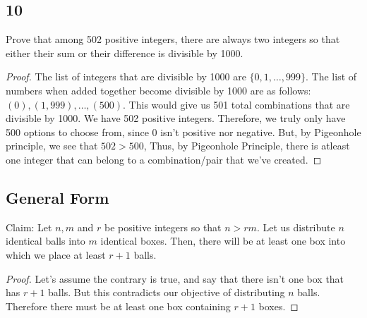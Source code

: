 \documentclass{amsart}
\begin{document}
\subsection*{10} Prove that among 502 positive integers, there are always two integers so that either their sum or their difference is divisible by 1000. 
\begin{proof}
    The list of integers that are divisible by 1000 are $\{0,1,\ldots,999\}$. The list of numbers when added together become divisible by 1000 are as follows: $(0), (1,999), \ldots, (500)$. This would give us 501 total combinations that are divisible by 1000. We have 502 positive integers. Therefore, we truly only have 500 options to choose from, since 0 isn't positive nor negative. But, by Pigeonhole principle, we see that $502 > 500$, Thus, by Pigeonhole Principle, there is atleast one integer that can belong to a combination/pair that we've created. 
\end{proof}
\subsection*{General Form} Claim: Let $n,m$ and $r$ be positive integers so that $n > rm$. Let us distribute $n$ identical balls into $m$ identical boxes. Then, there will be at least one box into which we place at least $r+1$ balls. 
\begin{proof}
    Let's assume the contrary is true, and say that there isn't one box that has $r+1$ balls. But this contradicts our objective of distributing $n$ balls. Therefore there must be at least one box containing $r+1$ boxes. 
\end{proof}
\end{document}
